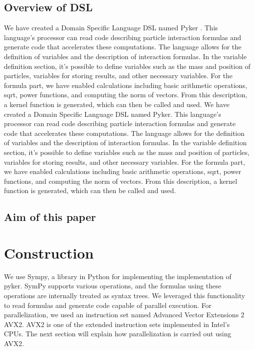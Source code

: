 \documentclass[ams, a4j]{U-AizuGT}
\begin{document}
\subsection{Overview of DSL}

We have created a Domain Specific Language  DSL \rparen named  Pyker \rparen. This language's 
processor can read code describing particle interaction formulas and generate code 
that accelerates these computations. The language allows for the definition of 
variables and the description of interaction formulas. In the variable definition 
section, it's possible to define variables such as the mass and position of 
particles, variables for storing results, and other necessary variables. For the formula
part, we have enabled calculations including basic arithmetic operations, sqrt, power 
functions, and computing the norm of vectors. From this description, a kernel function 
is generated, which can then be called and used. We have created a Domain Specific 
Language  DSL  named  Pyker. This language's processor can read code describing particle 
interaction formulas and generate code that accelerates these computations. The language allows
for the definition of variables and the description of interaction formulas. In the variable
definition section, it's possible to define variables such as the mass and position of 
particles, variables for storing results, and other necessary variables. For the formula part, 
we have enabled calculations including basic arithmetic operations, sqrt, power functions, and 
computing the norm of vectors. From this description, a kernel function is generated, which can then be called and used.
\subsection{Aim of this paper}



\section{Construction}
We use Sympy, a library in Python for implementing  the implementation of pyker.
SymPy supports various operations, and the formulas using these operations are internally treated as 
syntax trees. We leveraged this functionality to read formulas and generate code capable of parallel execution.
For parallelization, we used an instruction set named Advanced Vector Extensions 2 \lparen AVX2\rparen. AVX2 is one of the 
extended instruction sets implemented in Intel's CPUs. The next section will explain how parallelization is carried out using AVX2.
\end{document}
